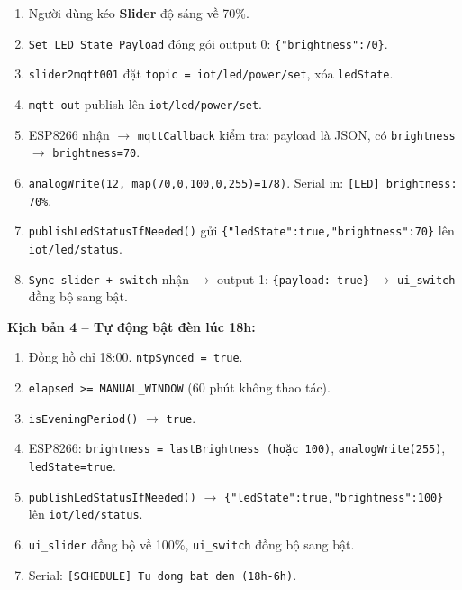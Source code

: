 \documentclass[13pt,a4paper]{article}
\newcommand{\code}[1]{\texttt{#1}}
\begin{document}
\begin{enumerate}[label=\arabic*., leftmargin=1.5cm]
    \item Người dùng kéo \textbf{Slider} độ sáng về 70\%.
    \item \code{Set LED State Payload} đóng gói output 0: \code{\{"brightness":70\}}.
    \item \code{slider2mqtt001} đặt \code{topic = iot/led/power/set}, xóa \code{ledState}.
    \item \code{mqtt out} publish lên \code{iot/led/power/set}.
    \item ESP8266 nhận $\rightarrow$ \code{mqttCallback} kiểm tra: payload là JSON, có \code{brightness} $\rightarrow$ \code{brightness=70}.
    \item \code{analogWrite(12, map(70,0,100,0,255)=178)}. Serial in: \code{[LED] brightness: 70\%}.
    \item \code{publishLedStatusIfNeeded()} gửi \code{\{"ledState":true,"brightness":70\}} lên \code{iot/led/status}.
    \item \code{Sync slider + switch} nhận $\rightarrow$ output 1: \code{\{payload: true\}} $\rightarrow$ \code{ui\_switch} đồng bộ sang bật.
\end{enumerate}

\textbf{Kịch bản 4 -- Tự động bật đèn lúc 18h:}

\begin{enumerate}[label=\arabic*., leftmargin=1.5cm]
    \item Đồng hồ chỉ 18:00. \code{ntpSynced = true}.
    \item \code{elapsed >= MANUAL\_WINDOW} (60 phút không thao tác).
    \item \code{isEveningPeriod()} $\rightarrow$ \code{true}.
    \item ESP8266: \code{brightness = lastBrightness (hoặc 100)}, \code{analogWrite(255)}, \code{ledState=true}.
    \item \code{publishLedStatusIfNeeded()} $\rightarrow$ \code{\{"ledState":true,"brightness":100\}} lên \code{iot/led/status}.
    \item \code{ui\_slider} đồng bộ về 100\%, \code{ui\_switch} đồng bộ sang bật.
    \item Serial: \code{[SCHEDULE] Tu dong bat den (18h-6h)}.
\end{enumerate}

\end{document}
